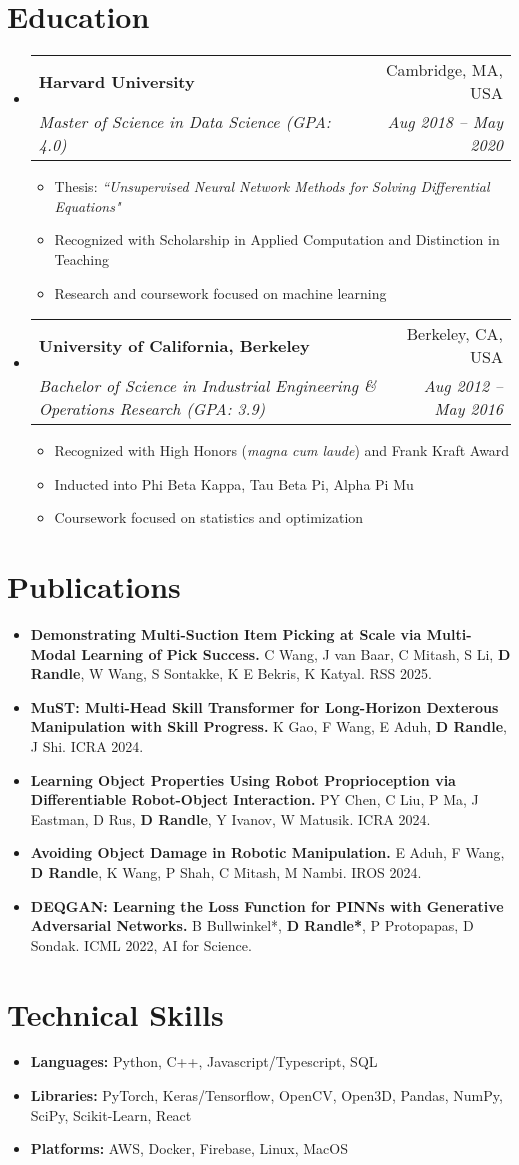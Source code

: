 \documentclass[a4paper,11pt]{article}
\makeatletter
\newcommand{\resumeItem}[1]{
  \item\small{#1}
}
\newcommand{\resumeItemListStart}{\begin{itemize}[rightmargin=0.11in]}
\newcommand{\resumeItemListEnd}{\end{itemize}}
\newcommand{\resumeQuadHeading}[4]{
  \item
  \begin{tabular*}{0.96\textwidth}[t]{l@{\extracolsep{\fill}}r}
    \textbf{#1} & #2 \\
    \textit{\small#3} & \textit{\small #4} \\
  \end{tabular*}
}
\newcommand{\resumeHeadingListStart}{
  \begin{itemize}[leftmargin=0.15in, label={}]
}
\newcommand{\resumeHeadingListEnd}{\end{itemize}}
\makeatother
\begin{document}
\section{Education}
  \resumeHeadingListStart{}
    \resumeQuadHeading{Harvard University}{Cambridge, MA, USA}
    {Master of Science in Data Science (GPA: 4.0)}{Aug 2018 -- May 2020}
    \resumeItemListStart{}
        \resumeItem{Thesis: \textit{``Unsupervised Neural Network Methods for Solving Differential Equations"}}
        \resumeItem{Recognized with Scholarship in Applied Computation and Distinction in Teaching}
        \resumeItem{Research and coursework focused on machine learning}
      
    \resumeItemListEnd{}
    \resumeQuadHeading{University of California, Berkeley}{Berkeley, CA, USA}
    {Bachelor of Science in Industrial Engineering \& Operations Research (GPA: 3.9)}{Aug 2012 -- May 2016}
    \resumeItemListStart{}
      \resumeItem{Recognized with High Honors (\textit{magna cum laude}) and Frank Kraft Award}
      \resumeItem{Inducted into Phi Beta Kappa, Tau Beta Pi, Alpha Pi Mu}
      \resumeItem{Coursework focused on statistics and optimization}
    \resumeItemListEnd{}
  \resumeHeadingListEnd{}


\section{Publications}
    \resumeItemListStart{}
        \resumeItem{\textbf{Demonstrating Multi-Suction Item Picking at Scale via Multi-Modal Learning of Pick Success.} C Wang, J van Baar, C Mitash, S Li, \textbf{D Randle}, W Wang, S Sontakke, K E Bekris, K Katyal. RSS 2025.}
        \resumeItem{\textbf{MuST: Multi-Head Skill Transformer for Long-Horizon Dexterous Manipulation with Skill Progress.} K Gao, F Wang, E Aduh, \textbf{D Randle}, J Shi. ICRA 2024.}
        \resumeItem{\textbf{Learning Object Properties Using Robot Proprioception via Differentiable Robot-Object Interaction.} PY Chen, C Liu, P Ma, J Eastman, D Rus, \textbf{D Randle}, Y Ivanov, W Matusik. ICRA 2024.}
        \resumeItem{\textbf{Avoiding Object Damage in Robotic Manipulation.} E Aduh, F Wang, \textbf{D Randle}, K Wang, P Shah, C Mitash, M Nambi. IROS 2024.}
        \resumeItem{\textbf{DEQGAN: Learning the Loss Function for PINNs with Generative Adversarial Networks.} B Bullwinkel*, \textbf{D Randle*}, P Protopapas, D Sondak. ICML 2022, AI for Science.}
    \resumeItemListEnd{}


\section{Technical Skills}
    \resumeItemListStart{}
        \resumeItem{\textbf{Languages:} Python, C++, Javascript/Typescript, SQL}
        \resumeItem{\textbf{Libraries:} PyTorch, Keras/Tensorflow, OpenCV, Open3D, Pandas, NumPy, SciPy, Scikit-Learn, React}
        \resumeItem{\textbf{Platforms:} AWS, Docker, Firebase, Linux, MacOS}
    \resumeItemListEnd{}
\end{document}
